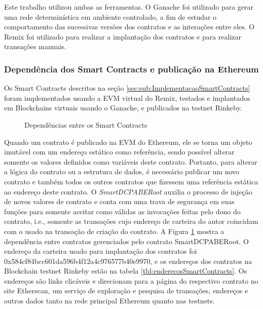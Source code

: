 \documentclass[a4paper,11pt]{article}
\begin{document}
Este trabalho utilizou ambas as ferramentas.
O Ganache foi utilizado para gerar uma rede determinística em ambiente controlado, a fim de estudar o comportamento das sucessivas versões dos contratos e as interações entre eles. %
O Remix foi utilizado para realizar a implantação dos contratos e para realizar transações manuais.

\subsubsection{Dependência dos Smart Contracts e publicação na Ethereum}


Os Smart Contracts descritos na seção \ref{sec:sub:ImplementacaoSmartContracts} foram implementados usando a EVM virtual do Remix, testados e implantados em Blockchains virtuais usando o Ganache, e  publicados na testnet Rinkeby.

\begin{figure}[!h]
  \centering
  
  \caption{Dependências entre os Smart Contracts}
  \label{fig:dependenciasSmartContracts}
\end{figure}

Quando um contrato é publicado na EVM do Ethereum, ele se torna um objeto imutável {\color{blue}com um endereço  estático como referência}, sendo possível alterar somente os valores definidos como variáveis deste contrato.
Portanto, para alterar a lógica do contrato ou a estrutura de dados, é necessário publicar um novo contrato e também todos os outros contratos que fizessem uma referência estática ao endereço deste contrato.
O \emph{SmartDCPABERoot} auxilia o processo de injeção de novos valores de contrato e conta com uma trava de segurança em suas funções para somente aceitar como válidas as invocações feitas pelo dono do contrato, i.e., somente as transações cujo  endereço de carteira do autor coincidam com o usado na transação de criação do contrato.
A Figura \ref{fig:dependenciasSmartContracts} mostra a dependência entre contratos gerenciados pelo contrato SmartDCPABERoot. %
O endereço da carteira usado para implantação dos contratos foi 0x584cf84bcc601da596b4f12a4c976577b40e9970, e os endereços dos contratos na Blockchain testnet Rinkeby estão na tabela \ref{tbl:enderecosSmartContracts}. %
Os endereços são links clicáveis e direcionam para a página do respectivo contrato no site Etherscan, um serviço de exploração e pesquisa de transações, endereços e outros dados tanto na rede principal Ethereum quanto nas testnets.
\end{document}
